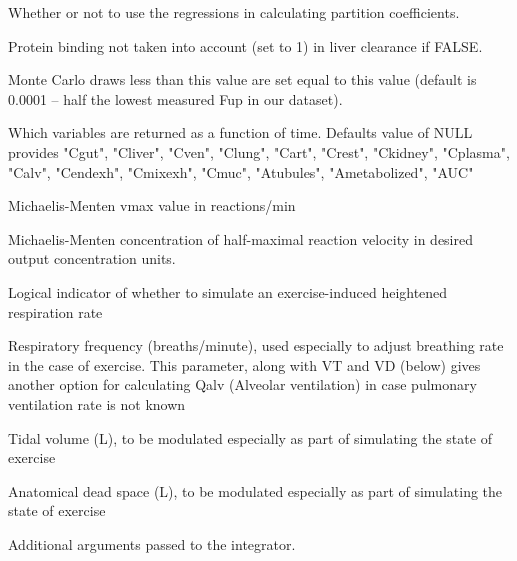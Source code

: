 \documentclass[a4paper]{book}
\begin{document}
\begin{Arguments}
\begin{ldescription}
\item[\code{regression}] Whether or not to use the regressions in calculating
partition coefficients.

\item[\code{restrictive.clearance}] Protein binding not taken into account (set to
1) in liver clearance if FALSE.

\item[\code{minimum.Funbound.plasma}] Monte Carlo draws less than this value are set 
equal to this value (default is 0.0001 -- half the lowest measured Fup in our
dataset).

\item[\code{monitor.vars}] Which variables are returned as a function of time. 
Defaults value of NULL provides "Cgut", "Cliver", "Cven", "Clung", "Cart",
"Crest", "Ckidney", "Cplasma", "Calv", "Cendexh", "Cmixexh", "Cmuc", 
"Atubules", "Ametabolized", "AUC"

\item[\code{vmax}] Michaelis-Menten vmax value in reactions/min

\item[\code{km}] Michaelis-Menten concentration of half-maximal reaction velocity
in desired output concentration units.

\item[\code{exercise}] Logical indicator of whether to simulate an exercise-induced
heightened respiration rate

\item[\code{fR}] Respiratory frequency (breaths/minute), used especially to adjust
breathing rate in the case of exercise. This parameter, along with VT and VD
(below) gives another option for calculating Qalv (Alveolar ventilation) 
in case pulmonary ventilation rate is not known

\item[\code{VT}] Tidal volume (L), to be modulated especially as part of simulating
the state of exercise

\item[\code{VD}] Anatomical dead space (L), to be modulated especially as part of
simulating the state of exercise

\item[\code{...}] Additional arguments passed to the integrator.
\end{ldescription}
\end{Arguments}
%
\end{document}

